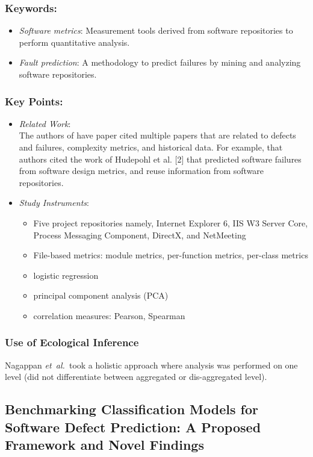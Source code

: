 \documentclass{sig-alternate-05-2015}
\newcommand{\etal}{\mbox{\emph{et al.\ }}}
\begin{document}
\subsubsection{Keywords:}
\begin{itemize}
\item \emph{Software metrics}: Measurement tools derived from software repositories to perform quantitative analysis.
\item \emph{Fault prediction}:  A methodology to predict failures by mining and analyzing software repositories.
\end{itemize} 

\subsubsection{Key Points:}
\begin{itemize}
\item \emph{Related Work}: \\
The authors of have paper cited multiple papers that are related to defects and failures, complexity metrics, and historical data. For example, that authors cited the work of Hudepohl et al. [2] that predicted software failures from software design metrics, and reuse information from software repositories.
\item \emph{Study Instruments}:
	\begin{itemize}
		\item Five project repositories namely, Internet Explorer 6, IIS W3 Server Core, Process Messaging Component, DirectX, and NetMeeting
		\item File-based metrics: module metrics, per-function metrics, per-class metrics
		\item logistic regression
		\item principal component analysis (PCA)
		\item correlation measures: Pearson, Spearman
	\end{itemize}
\end{itemize}

\subsubsection{Use of Ecological Inference}
Nagappan \etal  took a holistic approach where analysis was performed on one level (did not differentiate between aggregated or dis-aggregated level).

\subsection{Benchmarking Classification Models for Software Defect Prediction: A Proposed Framework and Novel Findings \cite{Lessmann:2008}}
\end{document}
